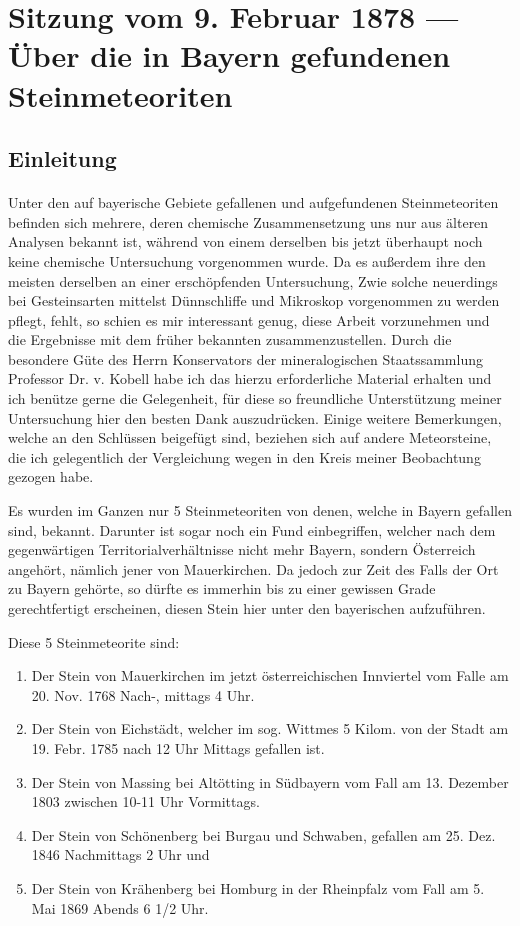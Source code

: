 \documentclass[a4paper, 11pt, oneside]{article}
\begin{document}
\section{Sitzung vom 9. Februar 1878 --- Über die in Bayern gefundenen Steinmeteoriten}
\subsection*{Einleitung}
\paragraph{}
Unter den auf bayerische Gebiete gefallenen und aufgefundenen Steinmeteoriten befinden sich mehrere, deren chemische Zusammensetzung uns nur aus älteren Analysen bekannt ist, während von einem derselben bis jetzt überhaupt noch keine chemische Untersuchung vorgenommen wurde. Da es außerdem ihre den meisten derselben an einer erschöpfenden Untersuchung, Zwie solche neuerdings bei Gesteinsarten mittelst Dünnschliffe und Mikroskop vorgenommen zu werden pflegt, fehlt, so schien es mir interessant genug, diese Arbeit vorzunehmen und die Ergebnisse mit dem früher bekannten zusammenzustellen. Durch die besondere Güte des Herrn Konservators der mineralogischen Staatssammlung Professor Dr. v. Kobell habe ich das hierzu erforderliche Material erhalten und ich benütze gerne die Gelegenheit, für diese so freundliche Unterstützung meiner Untersuchung hier den besten Dank auszudrücken. Einige weitere Bemerkungen, welche an den Schlüssen beigefügt sind, beziehen sich auf andere Meteorsteine, die ich gelegentlich der Vergleichung wegen in den Kreis meiner Beobachtung gezogen habe.

Es wurden im Ganzen nur 5 Steinmeteoriten von denen, welche in Bayern gefallen sind, bekannt. Darunter ist sogar noch ein Fund einbegriffen, welcher nach dem gegenwärtigen Territorialverhältnisse nicht mehr Bayern, sondern Österreich angehört, nämlich jener von Mauerkirchen. Da jedoch zur Zeit des Falls der Ort zu Bayern gehörte, so dürfte es immerhin bis zu einer gewissen Grade gerechtfertigt erscheinen, diesen Stein hier unter den bayerischen aufzuführen.

Diese 5 Steinmeteorite sind:
\begin{enumerate}
    \item Der Stein von Mauerkirchen im jetzt österreichischen Innviertel vom Falle am 20. Nov. 1768 Nach-, mittags 4 Uhr.
    \item Der Stein von Eichstädt, welcher im sog. Wittmes 5 Kilom. von der Stadt am 19. Febr. 1785 nach 12 Uhr Mittags gefallen ist.
    \item Der Stein von Massing bei Altötting in Südbayern vom Fall am 13. Dezember 1803 zwischen 10-11 Uhr Vormittags.
    \item Der Stein von Schönenberg bei Burgau und Schwaben, gefallen am 25. Dez. 1846 Nachmittags 2 Uhr und
    \item Der Stein von Krähenberg bei Homburg in der Rheinpfalz vom Fall am 5. Mai 1869 Abends 6 1/2 Uhr.
\end{enumerate}
\end{document}
